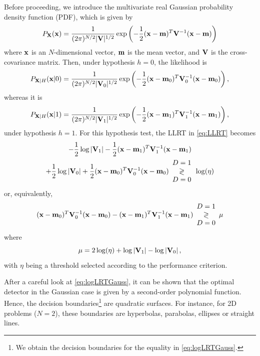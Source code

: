 Before proceeding, we introduce the multivariate real Gaussian probability density function (PDF), which is given by
\begin{equation}
P_{{\bf X}}({\bf x}) = \frac{1}{(2\pi)^{N/2} |{\bf V}|^{1/2}}
\exp\left(-\frac{1}{2}({\bf x}-{\bf m})^T {\bf V}^{-1}({\bf x}-{\bf m})\right)
\label{pXGauss}
\end{equation}
where ${\bf x}$ is an $N$-dimensional vector, ${\bf m}$ is the mean vector, and ${\bf V}$ is the cross-covariance matrix. Then, under hypothesis $h = 0$, the likelihood is
\begin{equation*}
P_{{\bf X}|H}({\bf x}|0) = \frac{1}{(2\pi)^{N/2} |{\bf V}_0|^{1/2}}
\exp\left(-\frac{1}{2}({\bf x}-{\bf m}_0)^T {\bf V}_0^{-1}({\bf x}-{\bf m}_0)\right),
\end{equation*}
whereas it is
\begin{equation*}
P_{{\bf X}|H}({\bf x}|1) = \frac{1}{(2\pi)^{N/2} |{\bf V}_1|^{1/2}}
\exp\left(-\frac{1}{2}({\bf x}-{\bf m}_1)^T {\bf V}_1^{-1}({\bf x}-{\bf m}_1)\right),
\end{equation*}
under hypothesis $h = 1$. For this hypothesis test, the LLRT in \eqref{eq:LLRT} becomes
\begin{multline*}
- \frac{1}{2}\log\left|{\bf V}_1 \right| 
- \frac{1}{2}({\bf x}-{\bf m}_1)^T {\bf V}_1^{-1}({\bf x}-{\bf m}_1) \\
+ \frac{1}{2}\log\left|{\bf V}_0 \right| 
+ \frac{1}{2}({\bf x}-{\bf m}_0)^T {\bf V}_0^{-1}({\bf x}-{\bf m}_0) 
\begin{array}{c} D=1 \\ \gtrless \\ D=0 \end{array} \log(\eta) 
\end{multline*}
or, equivalently,
\begin{align}
({\bf x}-{\bf m}_0)^T {\bf V}_0^{-1}({\bf x}-{\bf m}_0) 
- ({\bf x}-{\bf m}_1)^T {\bf V}_1^{-1}({\bf x}-{\bf m}_1)
\begin{array}{c} D=1 \\ \gtrless \\ D=0 \end{array} \mu
\label{eq:logLRTGauss}
\end{align}
where
\begin{equation*}
\mu = 2 \log(\eta) + \log\left|{\bf V}_1 \right| - \log\left|{\bf V}_0 \right|,
\end{equation*}
with $\eta$ being a threshold selected according to the performance criterion.

After a careful look at \eqref{eq:logLRTGauss}, it can be shown that the optimal detector in the Gaussian case is given by a second-order polynomial function. Hence, the decision boundaries\footnote{We obtain the decision boundaries for the equality in \eqref{eq:logLRTGauss}.} are quadratic surfaces. For instance, for 2D problems ($N = 2$), these boundaries are hyperbolas, parabolas, ellipses or straight lines.


